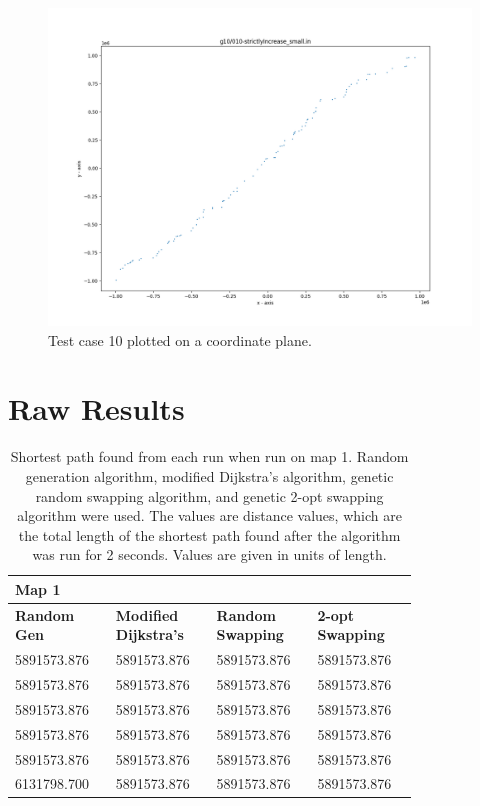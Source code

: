 \documentclass{article}
\begin{document}
\begin{appendices}
\begin{figure}[H]
	\includegraphics[scale=0.4]{code/visualizer/testdata/10.png}
	\caption{Test case 10 plotted on a coordinate plane.}
	\label{fig:10}
\end{figure}

\newpage
\section{Raw Results}
\label{appendix:RawResults}

\begin{table}[H]
    \caption{Shortest path found from each run when run on map 1. Random generation algorithm, modified Dijkstra's algorithm, genetic random swapping algorithm, and genetic 2-opt swapping algorithm were used. The values are distance values, which are the total length of the shortest path found after the algorithm was run for 2 seconds. Values are given in units of length.}\label{Table Map 1}
    \centering
    \begin{tabular}{|p{0.2\linewidth}|p{0.2\linewidth}|p{0.2\linewidth}|p{0.2\linewidth}|}
    \hline
        \textbf{Map 1} & ~ & ~ & ~ \\ \hline
        \textbf{Random Gen} & \textbf{Modified Dijkstra's} & \textbf{Random Swapping} & \textbf{2-opt Swapping} \\ \hline
        5891573.876 & 5891573.876 & 5891573.876 & 5891573.876 \\ \hline
        5891573.876 & 5891573.876 & 5891573.876 & 5891573.876 \\ \hline
        5891573.876 & 5891573.876 & 5891573.876 & 5891573.876 \\ \hline
        5891573.876 & 5891573.876 & 5891573.876 & 5891573.876 \\ \hline
        5891573.876 & 5891573.876 & 5891573.876 & 5891573.876 \\ \hline
        6131798.700 & 5891573.876 & 5891573.876 & 5891573.876 \\ \hline
    \end{tabular}
\end{table}


\end{appendices}
\end{document}

